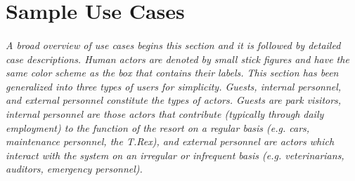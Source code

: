 \documentclass[12pt]{article}
\begin{document}
\section{Sample Use Cases} \label{samp}
\paragraph{} \textit{A broad overview of use cases begins this section and it is followed 
by detailed case descriptions. Human actors are denoted by small stick figures and have the 
same color scheme as the box that contains their labels. This section has been generalized into
three types of users for simplicity. Guests, internal personnel, and external personnel constitute
the types of actors. Guests are park visitors, internal personnel are those actors that contribute 
(typically through daily employment) to the function of the resort on a regular basis (e.g. cars, 
maintenance personnel, the T.Rex), and external personnel are actors which interact with the system
on an irregular or infrequent basis (e.g. veterinarians, auditors, emergency personnel).}

\pagebreak
\end{document}
